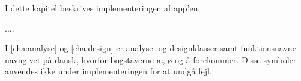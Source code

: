 I dette kapitel beskrives implementeringen af app'en. 

....

I \autoref{cha:analyse} og \autoref{cha:design} er analyse- og designklasser samt funktionsnavne navngivet på dansk, hvorfor bogstaverne æ, ø og å forekommer. Disse symboler anvendes ikke under implementeringen for at undgå fejl.